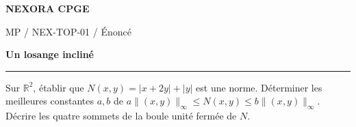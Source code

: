 \documentclass[11pt,a4paper]{article}
\begin{document}
{\small\bfseries\color{nexorablue} NEXORA CPGE}\par
{\small MP / NEX-TOP-01 / Énoncé}\par
{\LARGE\bfseries Un losange incliné}\par
\vspace{0.25em}\hrule\vspace{0.6em}

Sur $\mathbb R^2$, établir que $N(x,y)=|x+2y|+|y|$ est une norme. Déterminer les meilleures constantes $a,b$ de $a\|(x,y)\|_\infty\le N(x,y)\le b\|(x,y)\|_\infty$. Décrire les quatre sommets de la boule unité fermée de $N$.
\end{document}
